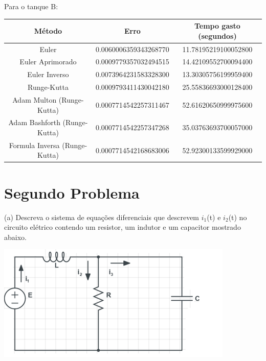 \documentclass[12pt]{article}%
\newcommand{\newpara}
    {
    \vskip 0.5cm
    }
\begin{document}
    \newpara
    Para o tanque B:
    \begin{center}
    \begin{tabular}{ |c| |c| |c| }
    \hline
    \textbf{Método}               & \textbf{Erro}         & \textbf{Tempo gasto (segundos)} \\ \hline
    Euler                         & 0.0060006359343268770 & 11.78195219100052800            \\ \hline
    Euler Aprimorado              & 0.0009779357032494515 & 14.42109552700094400            \\ \hline
    Euler Inverso                 & 0.0073964231583328300 & 13.30305756199959400            \\ \hline
    Runge-Kutta                   & 0.0009793411430042180 & 25.55836693000128400            \\ \hline
    Adam Multon     (Runge-Kutta) & 0.0007714542257311467 & 52.61620650999975600            \\ \hline
    Adam Bashforth (Runge-Kutta)  & 0.0007714542257347268 & 35.03763693700057000            \\ \hline
    Formula Inversa (Runge-Kutta) & 0.0007714542168683006 & 52.92300133599929000            \\ \hline
    \end{tabular}
    \end{center}
    
\newpage
\section{Segundo Problema}
     (a) Descreva o sistema de equações diferenciais que descrevem \(i_{1}\)(t) e \(i_{2}\)(t) no circuito elétrico contendo um resistor, um indutor e um capacitor mostrado abaixo.

    \begin{center}
        \includegraphics[scale=1.0]{problemas/p2a.png}
    \end{center}\
    
\end{document}
